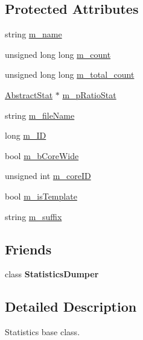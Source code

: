 \subsection*{Protected Attributes}
\begin{DoxyCompactItemize}
\item 
string \hyperlink{classAbstractStat_a0364622ef4333da55eb4ff1ce94444c5}{m\_\-name}
\item 
unsigned long long \hyperlink{classAbstractStat_a01d7f2515084aa821e717b2cb3ecbf34}{m\_\-count}
\item 
unsigned long long \hyperlink{classAbstractStat_a85a84b70539aea2b1318bd45b4d48104}{m\_\-total\_\-count}
\item 
\hyperlink{classAbstractStat}{AbstractStat} $\ast$ \hyperlink{classAbstractStat_a4b62c42003dcc7db965a323a2df01089}{m\_\-pRatioStat}
\item 
string \hyperlink{classAbstractStat_acc58d3d15674660dbf0955193712d36f}{m\_\-fileName}
\item 
long \hyperlink{classAbstractStat_aaa8defb9f5bac0e43ad521ee64334a43}{m\_\-ID}
\item 
bool \hyperlink{classAbstractStat_a39eb3f7796f91946e4fcb76be59c0951}{m\_\-bCoreWide}
\item 
unsigned int \hyperlink{classAbstractStat_ae5f64870f70c46c9d45421298fe14c41}{m\_\-coreID}
\item 
bool \hyperlink{classAbstractStat_aa26aa9ab90712eec3ca55ec236729d9b}{m\_\-isTemplate}
\item 
string \hyperlink{classAbstractStat_af7f98a59844e9417602d28b4849ef105}{m\_\-suffix}
\end{DoxyCompactItemize}
\subsection*{Friends}
\begin{DoxyCompactItemize}
\item 
\hypertarget{classAbstractStat_a4dc9044f574fde5c901b957ff1715ee8}{
class {\bfseries StatisticsDumper}}
\label{classAbstractStat_a4dc9044f574fde5c901b957ff1715ee8}

\end{DoxyCompactItemize}


\subsection{Detailed Description}
Statistics base class. 

